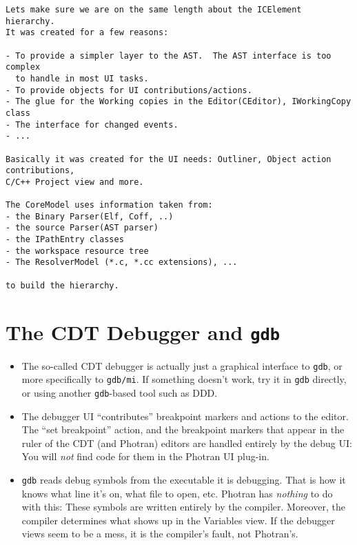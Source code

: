 \begin{verbatim}
Lets make sure we are on the same length about the ICElement hierarchy.
It was created for a few reasons:

- To provide a simpler layer to the AST.  The AST interface is too complex
  to handle in most UI tasks.
- To provide objects for UI contributions/actions.
- The glue for the Working copies in the Editor(CEditor), IWorkingCopy class
- The interface for changed events.
- ...

Basically it was created for the UI needs: Outliner, Object action contributions,
C/C++ Project view and more.

The CoreModel uses information taken from:
- the Binary Parser(Elf, Coff, ..)
- the source Parser(AST parser)
- the IPathEntry classes
- the workspace resource tree
- The ResolverModel (*.c, *.cc extensions), ...

to build the hierarchy.
\end{verbatim}

\section{The CDT Debugger and \texttt{gdb}}

\begin{itemize}

\item The so-called CDT debugger is actually just a graphical interface to
\texttt{gdb}, or more specifically to \texttt{gdb/mi}.  If something
doesn't work, try it in \texttt{gdb} directly, or using another
\texttt{gdb}-based tool such as DDD.

\item The debugger UI ``contributes'' breakpoint markers and actions
to the editor.  The ``set breakpoint'' action, and the breakpoint markers
that appear in the ruler of the CDT (and Photran) editors are handled
entirely by the debug UI: You will \textit{not} find code for them in the
Photran UI plug-in.

\item \texttt{gdb} reads debug symbols from the executable it is debugging.
That is how it knows what line it's on, what file to open, etc.  Photran
has \textit{nothing} to do with this: These symbols are written entirely
by the compiler.  Moreover, the compiler determines what shows up in the
Variables view.  If the debugger views seem to be a mess, it is the
compiler's fault, not Photran's.

\end{itemize}

